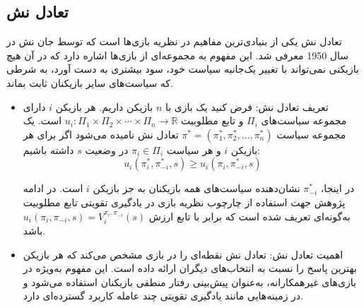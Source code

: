 \subsection{تعادل نش}
تعادل نش
 یکی از بنیادی‌ترین مفاهیم در نظریه بازی‌ها است که توسط جان نش در سال 1950 معرفی شد. این مفهوم به مجموعه‌ای از ‌بازی‌ها اشاره دارد که در آن هیچ بازیکنی نمی‌تواند با تغییر یک‌جانبه سیاست خود، سود بیشتری به دست آورد، به شرطی که سیاست‌های سایر بازیکنان ثابت بماند.


\begin{itemize}
	\item تعریف تعادل نش:
	فرض کنید یک بازی با \( n \) بازیکن داریم. هر بازیکن \( i \) دارای مجموعه سیاست‌های \( \Pi_i \) و تابع مطلوبیت \( u_i: \Pi_1 \times \Pi_2 \times \cdots \times \Pi_n \rightarrow \mathbb{R} \) است. یک مجموعه سیاست \( \pi^* = (\pi_1^*, \pi_2^*, \ldots, \pi_n^*) \) تعادل نش نامیده می‌شود اگر برای هر بازیکن \( i \) و هر سیاست \( \pi_i \in \Pi_i \)
	 در وضعیت \(s\)
	 داشته باشیم:
\begin{equation}
		u_i(\pi_i^*, \pi_{-i}^*, s) \geq u_i(\pi_i, \pi_{-i}^*, s)
\end{equation}
	
	در اینجا، \( \pi_{-i}^* \) نشان‌دهنده سیاست‌های همه بازیکنان به جز بازیکن \( i \) است. در ادامه پژوهش جهت استفاده از چارچوب نظریه بازی در یادگیری تقویتی تابع مطلوبیت به‌گونه‌ای تعریف شده است که برابر با تابع ارزش
	\(u_i(\pi_i, \pi_{-i}, s)
	= V_i^{\pi_i, \pi_{-i}}(s)\)
	 باشد.
	
	\item اهمیت تعادل نش:
	تعادل نش نقطه‌ای را در بازی مشخص می‌کند که هر بازیکن بهترین پاسخ را نسبت به انتخاب‌های دیگران ارائه داده است. این مفهوم به‌ویژه در بازی‌های غیرهمکارانه، به‌عنوان پیش‌بینی رفتار منطقی بازیکنان استفاده می‌شود و در زمینه‌هایی مانند یادگیری تقویتی چند عامله کاربرد گسترده‌ای دارد.
\end{itemize}



